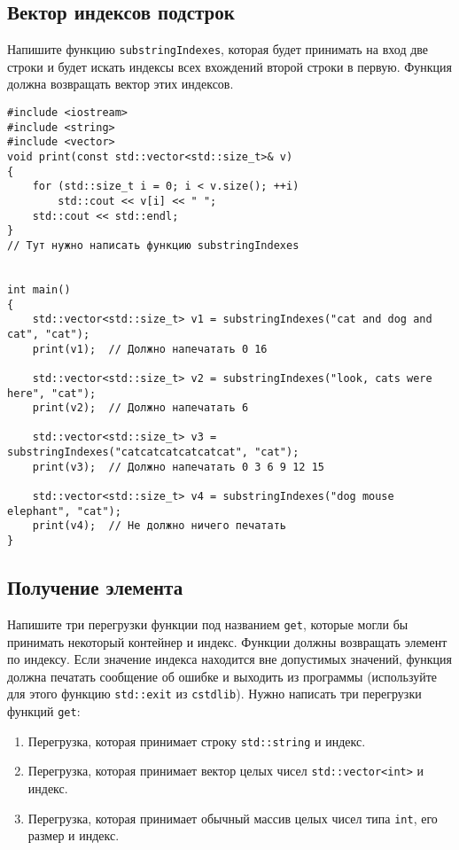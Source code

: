 \documentclass{article}
\begin{document}
\subsection{Вектор индексов подстрок}
Напишите функцию \texttt{substringIndexes}, которая будет принимать на вход две строки и будет искать индексы всех вхождений второй строки в первую. Функция должна возвращать вектор этих индексов.
\begin{lstlisting}
#include <iostream>
#include <string>
#include <vector>
void print(const std::vector<std::size_t>& v)
{
    for (std::size_t i = 0; i < v.size(); ++i)
        std::cout << v[i] << " ";
    std::cout << std::endl;
}
// Тут нужно написать функцию substringIndexes


int main()
{
    std::vector<std::size_t> v1 = substringIndexes("cat and dog and cat", "cat");
    print(v1);  // Должно напечатать 0 16
    
    std::vector<std::size_t> v2 = substringIndexes("look, cats were here", "cat");
    print(v2);  // Должно напечатать 6
  
    std::vector<std::size_t> v3 = substringIndexes("catcatcatcatcatcat", "cat");
    print(v3);  // Должно напечатать 0 3 6 9 12 15
    
    std::vector<std::size_t> v4 = substringIndexes("dog mouse elephant", "cat");
    print(v4);  // Не должно ничего печатать
}
\end{lstlisting}



\subsection{Получение элемента}
Напишите три перегрузки функции под названием \texttt{get}, которые могли бы принимать некоторый контейнер и индекс. Функции должны возвращать элемент по индексу. Если значение индекса находится вне допустимых значений, функция должна печатать сообщение об ошибке и выходить из программы (используйте для этого функцию \texttt{std::exit} из \texttt{cstdlib}). Нужно написать три перегрузки функций \texttt{get}:
\begin{enumerate}
\item Перегрузка, которая принимает строку \texttt{std::string} и индекс.
\item Перегрузка, которая принимает вектор целых чисел \texttt{std::vector<int>} и индекс.
\item Перегрузка, которая принимает обычный массив целых чисел типа \texttt{int}, его размер и индекс.
\end{enumerate}
\end{document}
